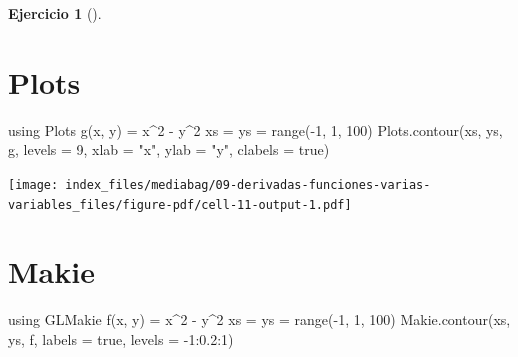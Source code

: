 \documentclass[
  a4paper,
]{scrreport}
\newenvironment{Shaded}{\begin{snugshade}}{\end{snugshade}}
\newcommand{\BuiltInTok}[1]{\textcolor[rgb]{0.00,0.23,0.31}{#1}}
\newcommand{\ConstantTok}[1]{\textcolor[rgb]{0.56,0.35,0.01}{#1}}
\newcommand{\FloatTok}[1]{\textcolor[rgb]{0.68,0.00,0.00}{#1}}
\newcommand{\FunctionTok}[1]{\textcolor[rgb]{0.28,0.35,0.67}{#1}}
\newcommand{\ImportTok}[1]{\textcolor[rgb]{0.00,0.46,0.62}{#1}}
\newcommand{\NormalTok}[1]{\textcolor[rgb]{0.00,0.23,0.31}{#1}}
\newcommand{\OperatorTok}[1]{\textcolor[rgb]{0.37,0.37,0.37}{#1}}
\newcommand{\StringTok}[1]{\textcolor[rgb]{0.13,0.47,0.30}{#1}}
\theoremstyle{definition}
\newtheorem{exercise}{Ejercicio}[chapter]
\theoremstyle{remark}
\begin{document}
\begin{exercise}[]
\begin{enumerate}
\begin{tcolorbox}
  \section{Plots}

\begin{Shaded}
\begin{Highlighting}[]
\ImportTok{using} \BuiltInTok{Plots}
\FunctionTok{g}\NormalTok{(x, y) }\OperatorTok{=}\NormalTok{ x}\OperatorTok{\^{}}\FloatTok{2} \OperatorTok{{-}}\NormalTok{ y}\OperatorTok{\^{}}\FloatTok{2}
\NormalTok{xs }\OperatorTok{=}\NormalTok{ ys }\OperatorTok{=} \FunctionTok{range}\NormalTok{(}\OperatorTok{{-}}\FloatTok{1}\NormalTok{, }\FloatTok{1}\NormalTok{, }\FloatTok{100}\NormalTok{)}
\NormalTok{Plots.}\FunctionTok{contour}\NormalTok{(xs, ys, g, levels }\OperatorTok{=} \FloatTok{9}\NormalTok{, xlab }\OperatorTok{=} \StringTok{"x"}\NormalTok{, ylab }\OperatorTok{=} \StringTok{"y"}\NormalTok{, clabels }\OperatorTok{=} \ConstantTok{true}\NormalTok{)}
\end{Highlighting}
\end{Shaded}

  \texttt{[image: index\_files/mediabag/09-derivadas-funciones-varias-variables\_files/figure-pdf/cell-11-output-1.pdf]}

  \section{Makie}

\begin{Shaded}
\begin{Highlighting}[]
\ImportTok{using} \BuiltInTok{GLMakie}
\FunctionTok{f}\NormalTok{(x, y) }\OperatorTok{=}\NormalTok{ x}\OperatorTok{\^{}}\FloatTok{2} \OperatorTok{{-}}\NormalTok{ y}\OperatorTok{\^{}}\FloatTok{2}
\NormalTok{xs }\OperatorTok{=}\NormalTok{ ys }\OperatorTok{=} \FunctionTok{range}\NormalTok{(}\OperatorTok{{-}}\FloatTok{1}\NormalTok{, }\FloatTok{1}\NormalTok{, }\FloatTok{100}\NormalTok{)}
\NormalTok{Makie.}\FunctionTok{contour}\NormalTok{(xs, ys, f, labels }\OperatorTok{=} \ConstantTok{true}\NormalTok{,  levels }\OperatorTok{=} \OperatorTok{{-}}\FloatTok{1}\OperatorTok{:}\FloatTok{0.2}\OperatorTok{:}\FloatTok{1}\NormalTok{)}
\end{Highlighting}
\end{Shaded}


\end{tcolorbox}
\end{enumerate}
\end{exercise}
\end{document}

